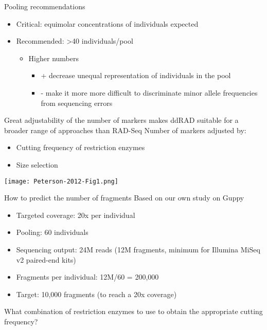 \documentclass[presentation]{beamer}
\begin{document}
\begin{frame}[label={sec:org94425be}]{Pooling recommendations}
\begin{itemize}
\item Critical: equimolar concentrations of individuals expected
\item Recommended: >40 individuals/pool
\begin{itemize}
\item Higher numbers
\begin{itemize}
\item + decrease unequal representation of individuals in
the pool
\item - make it more more difficult to discriminate minor allele
frequencies from sequencing errors
\end{itemize}
\end{itemize}
\end{itemize}
\end{frame}
\begin{frame}[label={sec:org8195b90}]{Great adjustability of the number of markers makes ddRAD suitable for a broader range of approaches than RAD-Seq}
Number of markers adjusted by:
\begin{itemize}
\item Cutting frequency of restriction enzymes
\item Size selection
\end{itemize}
\begin{center}
\texttt{[image: Peterson-2012-Fig1.png]}
\end{center}   
\begin{latex}
\begin{center}
\tiny{\citep{Peterson2012}}
\end{center}
\end{latex}
\end{frame}
\begin{frame}[label={sec:orgae31f86}]{How to predict the number of fragments}
Based on our own study on Guppy
\begin{itemize}
\item Targeted coverage: 20x per individual
\item Pooling: 60 individuals
\item Sequencing output: 24M reads (12M fragments, minimum for Illumina MiSeq v2
paired-end kits)
\item Fragments per individual: 12M/60 = 200,000

\item Target: \alert{10,000} fragments (to reach a 20x coverage)
\end{itemize}

What combination of restriction enzymes to use to obtain the appropriate cutting
frequency?
\end{frame}
\end{document}
